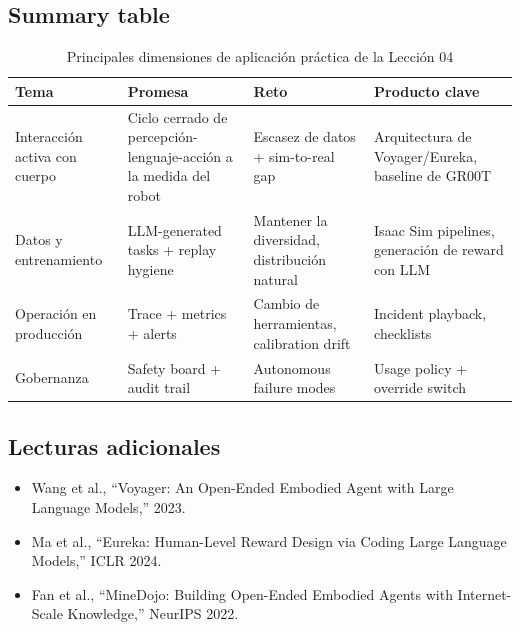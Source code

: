 \documentclass[a4paper]{article}
\begin{document}
\subsection{Summary table}

\begin{table}[H]
\centering
\begin{tabular}{p{} p{} p{} p{}}
\toprule
Tema & Promesa & Reto & Producto clave \\
\midrule
Interacción activa con cuerpo & Ciclo cerrado de percepción-lenguaje-acción a la medida del robot & Escasez de datos + sim-to-real gap & Arquitectura de Voyager/Eureka, baseline de GR00T \\
Datos y entrenamiento & LLM-generated tasks + replay hygiene & Mantener la diversidad, distribución natural & Isaac Sim pipelines, generación de reward con LLM \\
Operación en producción & Trace + metrics + alerts & Cambio de herramientas, calibration drift & Incident playback, checklists \\
Gobernanza & Safety board + audit trail & Autonomous failure modes & Usage policy + override switch \\
\bottomrule
\end{tabular}
\caption{Principales dimensiones de aplicación práctica de la Lección 04}
\end{table}

\subsection{Lecturas adicionales}

\begin{itemize}
    \item Wang et al., ``Voyager: An Open-Ended Embodied Agent with Large Language Models,'' 2023.
    \item Ma et al., ``Eureka: Human-Level Reward Design via Coding Large Language Models,'' ICLR 2024.
    \item Fan et al., ``MineDojo: Building Open-Ended Embodied Agents with Internet-Scale Knowledge,'' NeurIPS 2022.
\end{itemize}
\end{document}
